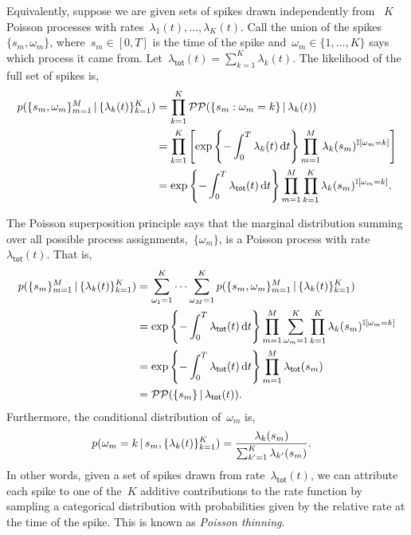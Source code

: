 Equivalently, suppose we are given sets of spikes drawn independently
from ~$K$ Poisson processes with rates~${\lambda_1(t), \ldots,
  \lambda_K(t)}$.  Call the union of the spikes~${\{s_m,
  \omega_m\}}$, where~${s_m \in [0,T]}$ is the time of the spike
and~${\omega_m \in \{1, \ldots, K\}}$ says which process it came
from. Let~${\lambda_{\mathsf{tot}}(t) = \sum_{k=1}^K \lambda_k(t)}$.
The likelihood of the full set of spikes is,
\begin{align*}
  p(\{s_m, \omega_m\}_{m=1}^M \,|\, \{\lambda_k(t)\}_{k=1}^K)
  &= \prod_{k=1}^K \mathcal{PP}(\{s_m: \omega_m=k\} \,|\, \lambda_k(t)) \\
  &= \prod_{k=1}^K \left[
    \exp\left\{-\int_0^T \lambda_k(t) \, \mathrm{d}t\right\}
    \prod_{m=1}^M \lambda_k(s_m)^{\mathbb{I}[\omega_m = k]} \right] \\
  &= \exp\left\{-\int_0^T \lambda_{\mathsf{tot}}(t) \, \mathrm{d}t\right\}
  \prod_{m=1}^M \prod_{k=1}^K \lambda_k(s_m)^{\mathbb{I}[\omega_m = k]}.
\end{align*}

The Poisson superposition principle says that the marginal distribution
summing over all possible process assignments,~$\{\omega_m\}$, is a Poisson
process with rate~$\lambda_{\mathsf{tot}}(t)$. That is,
\begin{align*}
  p(\{s_m\}_{m=1}^M \,|\, \{\lambda_k(t)\}_{k=1}^K)
  &= \sum_{\omega_1=1}^K \cdots \sum_{\omega_M=1}^K p(\{s_m, \omega_m\}_{m=1}^M \,|\, \{\lambda_k(t)\}_{k=1}^K) \\
  &= \exp\left\{-\int_0^T \lambda_{\mathsf{tot}}(t) \, \mathrm{d}t\right\}
  \prod_{m=1}^M \sum_{\omega_m=1}^K \prod_{k=1}^K \lambda_k(s_m)^{\mathbb{I}[\omega_m = k]} \\
  &= \exp\left\{-\int_0^T \lambda_{\mathsf{tot}}(t) \, \mathrm{d}t\right\}
  \prod_{m=1}^M \lambda_{\mathsf{tot}}(s_m) \\
  &= \mathcal{PP}(\{s_m\} \,|\, \lambda_{\mathsf{tot}}(t)).
\end{align*}
Furthermore, the conditional distribution of~$\omega_m$ is,
\begin{align*}
  p(\omega_m=k \,|\, s_m, \{\lambda_k(t)\}_{k=1}^K)
  &= \frac{\lambda_k(s_m)}{\sum_{k'=1}^K \lambda_{k'}(s_m)}.
\end{align*}
In other words, given a set of spikes drawn from rate~$\lambda_{\mathsf{tot}}(t)$,
we can attribute each spike to one of the~$K$ additive contributions
to the rate function by sampling a categorical distribution with probabilities
given by the relative rate at the time of the spike. This is known as
\emph{Poisson thinning}.

